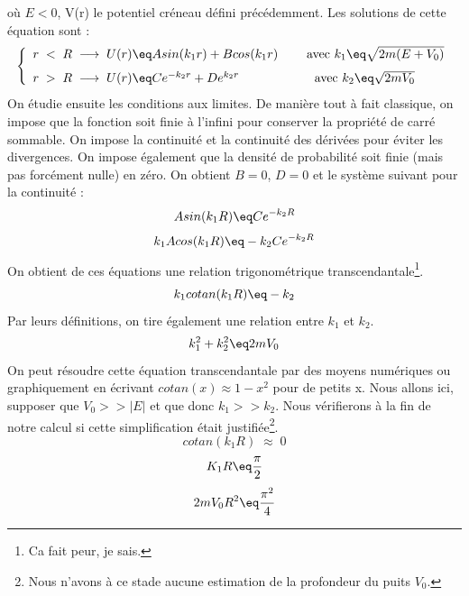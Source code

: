 où $E<0$, V(r) le potentiel créneau défini précédemment.
Les solutions de cette équation sont :
\begin{equation*}
    \left\{
    \begin{array}{ll}
        r \;<\; R\; \longrightarrow \; U(r) \eq Asin(k_1r) + B cos(k_1 r) \qquad \; \text{avec } k_1 \eq \sqrt{2m(E+V_0)}
    \\[7pt]
         r \;>\; R\; \longrightarrow \; U(r) \eq C e^{-k_2r} + D e^{k_2 r} \qquad \qquad \qquad \text{avec } k_2 \eq \sqrt{2mV_0}
    \end{array}
    \right.
\end{equation*}
On étudie ensuite les conditions aux limites. De manière tout à fait classique, on impose que la fonction soit finie à l'infini pour conserver la propriété de carré sommable. On impose la continuité et la continuité des dérivées pour éviter les divergences. On impose également que la densité de probabilité soit finie (mais pas forcément nulle) en zéro. On obtient $B = 0$, $D = 0$ et le système suivant pour la continuité :
\begin{equation*}
    Asin(k_1R) \eq Ce^{-k_2 R}
\end{equation*}
\begin{equation*}
    k_1Acos(k_1R) \eq -k_2 C e^{-k_2 R}
\end{equation*}
On obtient de ces équations une relation trigonométrique transcendantale\footnote{Ca fait peur, je sais.}.
\begin{equation*}
    k_1 cotan(k_1R)  \eq -k_2
\end{equation*}
Par leurs définitions, on tire également une relation entre $k_1$ et $k_2$.
\begin{equation*}
    k_1^2 + k_2^2 \eq 2mV_0
\end{equation*}
On peut résoudre cette équation transcendantale par des moyens numériques ou graphiquement en écrivant $cotan(x) \approx 1 - x^2$ pour de petits x. Nous allons ici, supposer que $V_0 >> |E|$ et que donc $k_1 >> k_2$. Nous vérifierons à la fin de notre calcul si cette simplification était justifiée\footnote{Nous n'avons à ce stade aucune estimation de la profondeur du puits $V_0$.}.
\begin{equation*}
    cotan(k_1R) \; \approx \; 0
\end{equation*}
\begin{equation*}
    K_1 R \eq \frac{\pi}{2}
\end{equation*}
\begin{equation*}
    2mV_0 R^2 \eq \frac{\pi^2}{4}
\end{equation*}
